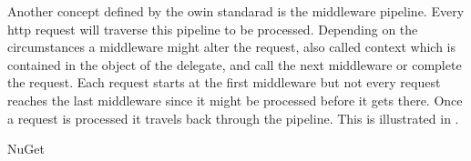 Another concept defined by the \gls{owin} standarad is the middleware pipeline. Every \gls{http} request will traverse this pipeline to be processed. Depending on the circumstances a middleware might alter the request, also called context which is contained in the  object of the delegate, and call the next middleware or complete the request. Each request starts at the first middleware but not every request reaches the last middleware since it might be processed before it gets there. Once a request is processed it travels back through the pipeline. This is illustrated in .



NuGet
